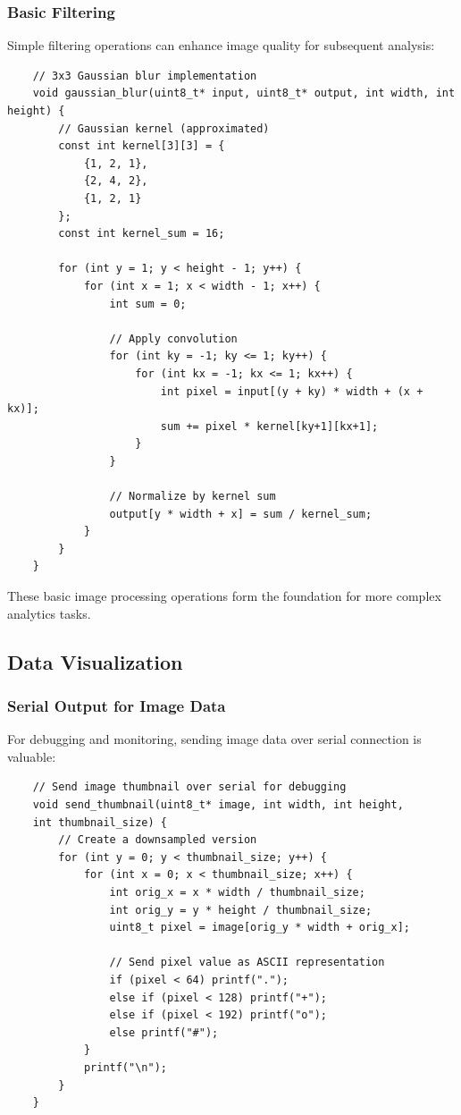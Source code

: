 \subsubsection{Basic Filtering}
Simple filtering operations can enhance image quality for subsequent analysis:

\begin{verbatim}
	// 3x3 Gaussian blur implementation
	void gaussian_blur(uint8_t* input, uint8_t* output, int width, int height) {
		// Gaussian kernel (approximated)
		const int kernel[3][3] = {
			{1, 2, 1},
			{2, 4, 2},
			{1, 2, 1}
		};
		const int kernel_sum = 16;
		
		for (int y = 1; y < height - 1; y++) {
			for (int x = 1; x < width - 1; x++) {
				int sum = 0;
				
				// Apply convolution
				for (int ky = -1; ky <= 1; ky++) {
					for (int kx = -1; kx <= 1; kx++) {
						int pixel = input[(y + ky) * width + (x + kx)];
						sum += pixel * kernel[ky+1][kx+1];
					}
				}
				
				// Normalize by kernel sum
				output[y * width + x] = sum / kernel_sum;
			}
		}
	}
\end{verbatim}

These basic image processing operations form the foundation for more complex analytics tasks.

\subsection{Data Visualization}
\subsubsection{Serial Output for Image Data}
For debugging and monitoring, sending image data over serial connection is valuable:

\begin{verbatim}
	// Send image thumbnail over serial for debugging
	void send_thumbnail(uint8_t* image, int width, int height, 
	int thumbnail_size) {
		// Create a downsampled version
		for (int y = 0; y < thumbnail_size; y++) {
			for (int x = 0; x < thumbnail_size; x++) {
				int orig_x = x * width / thumbnail_size;
				int orig_y = y * height / thumbnail_size;
				uint8_t pixel = image[orig_y * width + orig_x];
				
				// Send pixel value as ASCII representation
				if (pixel < 64) printf(".");
				else if (pixel < 128) printf("+");
				else if (pixel < 192) printf("o");
				else printf("#");
			}
			printf("\n");
		}
	}
\end{verbatim}

